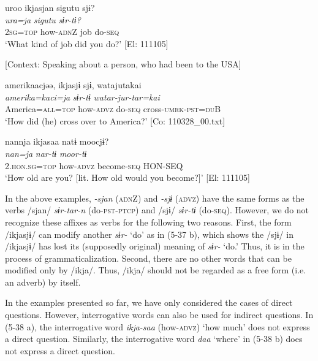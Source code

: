 \ea \label{ex:5:37}  \ea \label{ex:5:a} %
\glll  uroo  ikjasjan  sigutu  sjɨ?\\
\textit{ura=ja}  \textit{}  \textit{sigutu}  \textit{sɨr-tɨ?}\\
2\textsc{sg}=\textsc{top}  how-\textsc{adn}Z  job  do-\textsc{seq}\\
\glt ‘What kind of job did you do?’ [El: 111105]

 \ex \label{ex:5:b} [Context: Speaking about a person, who had been to the USA]

\glll  {\textbar}amerika{\textbar}acjəə,  ikjasjɨ  sjɨ,  watajutakai\\
\textit{amerika=kaci=ja}  \textit{}  \textit{sɨr-tɨ}  \textit{watar-jur-tar=kai}\\
America=\textsc{all}=\textsc{top}  how-\textsc{advz}  do-\textsc{seq}  cross-\textsc{umrk}-\textsc{pst}=\textsc{du}B\\
\glt ‘How did (he) cross over to America?’ [Co: 110328\_00.txt]

 \ex \label{ex:5:c} %
\glll  nannja  ikjasaa  natɨ  moocjɨ?\\
\textit{nan=ja}  \textit{}  \textit{nar-tɨ}  \textit{moor-tɨ}\\
2.\textsc{hon}.\textsc{sg}=\textsc{top}  how-\textsc{advz}  become-\textsc{seq}  HON-SEQ\\
\glt ‘How old are you? [lit. How old would you become?]’ [El: 111105]
\z
\z

In the above examples, \textit{{}-sjan} (\textsc{adn}Z) and \textit{{}-sjɨ} (\textsc{advz}) have the same forms as the verbs /sjan/ \textit{sɨr-tar-n} (do-\textsc{pst}-\textsc{ptcp}) and /sjɨ/ \textit{sɨr-tɨ} (do-\textsc{seq}). However, we do not recognize these affixes as verbs for the following two reasons. First, the form /ikjasjɨ/ can modify another \textit{sɨr-} ‘do’ as in (5-37 b), which shows the /sjɨ/ in /ikjasjɨ/ has lost its (supposedly original) meaning of \textit{sɨr-} ‘do.’ Thus, it is in the process of grammaticalization. Second, there are no other words that can be modified only by /ikja/. Thus, /ikja/ should not be regarded as a free form (i.e. an adverb) by itself.

  In the examples presented so far, we have only considered the cases of direct questions. However, interrogative words can also be used for indirect questions. In (5-38 a), the interrogative word \textit{ikja-saa} (how-\textsc{advz}) ‘how much’ does not express a direct question. Similarly, the interrogative word \textit{daa} ‘where’ in (5-38 b) does not express a direct question.

